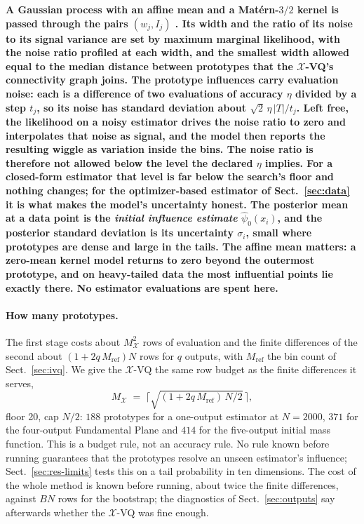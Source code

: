 \documentclass[runningheads]{llncs}
\newif\ifrev \revtrue
\newcommand{\rev}[1]{\ifrev{\color{blue}\bfseries #1}\else#1\fi}
\newcommand{\XVQ}{\ensuremath{\mathcal{X}}-VQ}
\newcommand{\MX}{M_{\mathcal{X}}}
\newcommand{\psinull}{\hat{\psi}_0}
\begin{document}
\rev{A Gaussian process with an affine mean and a Mat\'ern-$3/2$ kernel is passed through the pairs $(w_j, I_j)$ \cite{rasmussen2006}. Its width and the ratio of its noise to its signal variance are set by maximum marginal likelihood, with the noise ratio profiled at each width, and the smallest width allowed equal to the median distance between prototypes that the \XVQ's connectivity graph joins. The prototype influences carry evaluation noise: each is a difference of two evaluations of accuracy $\eta$ divided by a step $t_j$, so its noise has standard deviation about $\sqrt{2}\,\eta\,|T|/t_j$. Left free, the likelihood on a noisy estimator drives the noise ratio to zero and interpolates that noise as signal, and the model then reports the resulting wiggle as variation inside the bins. The noise ratio is therefore not allowed below the level the declared $\eta$ implies. For a closed-form estimator that level is far below the search's floor and nothing changes; for the optimizer-based estimator of Sect.~\ref{sec:data} it is what makes the model's uncertainty honest. The posterior mean at a data point is the \emph{initial influence estimate} $\psinull(x_i)$, and the posterior standard deviation is its uncertainty $\sigma_i$, small where prototypes are dense and large in the tails. The affine mean matters: a zero-mean kernel model returns to zero beyond the outermost prototype, and on heavy-tailed data the most influential points lie exactly there. No estimator evaluations are spent here.}

\rev{\paragraph{How many prototypes.} The first stage costs about $\MX^2$ rows of evaluation and the finite differences of the second about $(1 + 2q\,M_{\mathrm{ref}})N$ rows for $q$ outputs, with $M_{\mathrm{ref}}$ the bin count of Sect.~\ref{sec:ivq}. We give the \XVQ{} the same row budget as the finite differences it serves,
\begin{equation}\label{eq:MX}
\MX \;=\; \Big\lceil \sqrt{(1 + 2q\,M_{\mathrm{ref}})\,N/2}\,\Big\rceil,
\end{equation}
floor 20, cap $N/2$: $188$ prototypes for a one-output estimator at $N = 2000$, $371$ for the four-output Fundamental Plane and $414$ for the five-output initial mass function. This is a budget rule, not an accuracy rule. No rule known before running guarantees that the prototypes resolve an unseen estimator's influence; Sect.~\ref{sec:res-limits} tests this on a tail probability in ten dimensions. The cost of the whole method is known before running, about twice the finite differences, against $BN$ rows for the bootstrap; the diagnostics of Sect.~\ref{sec:outputs} say afterwards whether the \XVQ{} was fine enough.}
\end{document}
